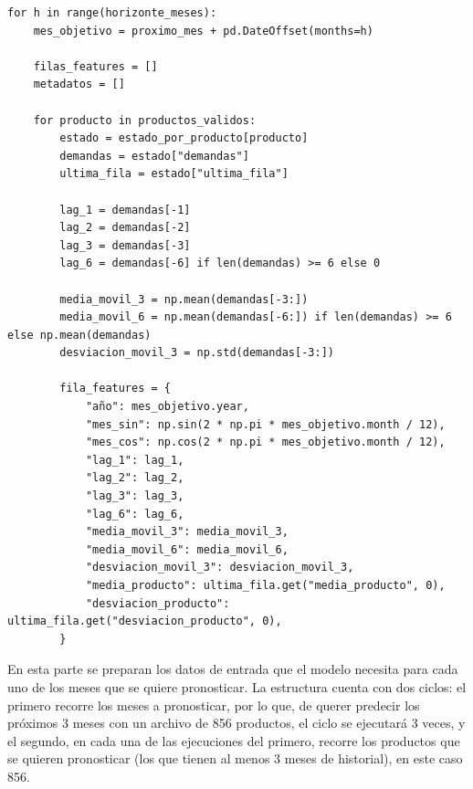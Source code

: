 \begin{verbatim}
for h in range(horizonte_meses):
    mes_objetivo = proximo_mes + pd.DateOffset(months=h)

    filas_features = []
    metadatos = []

    for producto in productos_validos:
        estado = estado_por_producto[producto]
        demandas = estado["demandas"]
        ultima_fila = estado["ultima_fila"]

        lag_1 = demandas[-1]
        lag_2 = demandas[-2]
        lag_3 = demandas[-3]
        lag_6 = demandas[-6] if len(demandas) >= 6 else 0

        media_movil_3 = np.mean(demandas[-3:])
        media_movil_6 = np.mean(demandas[-6:]) if len(demandas) >= 6 else np.mean(demandas)
        desviacion_movil_3 = np.std(demandas[-3:])

        fila_features = {
            "año": mes_objetivo.year,
            "mes_sin": np.sin(2 * np.pi * mes_objetivo.month / 12),
            "mes_cos": np.cos(2 * np.pi * mes_objetivo.month / 12),
            "lag_1": lag_1,
            "lag_2": lag_2,
            "lag_3": lag_3,
            "lag_6": lag_6,
            "media_movil_3": media_movil_3,
            "media_movil_6": media_movil_6,
            "desviacion_movil_3": desviacion_movil_3,
            "media_producto": ultima_fila.get("media_producto", 0),
            "desviacion_producto": ultima_fila.get("desviacion_producto", 0),
        }
\end{verbatim}

En esta parte se preparan los datos de entrada que el modelo necesita para cada uno de los meses que se quiere pronosticar. La estructura cuenta con dos ciclos: el primero recorre los meses a pronosticar, por lo que, de querer predecir los próximos 3 meses con un archivo de 856 productos, el ciclo se ejecutará 3 veces, y el segundo, en cada una de las ejecuciones del primero, recorre los productos que se quieren pronosticar (los que tienen al menos 3 meses de historial), en este caso 856.

